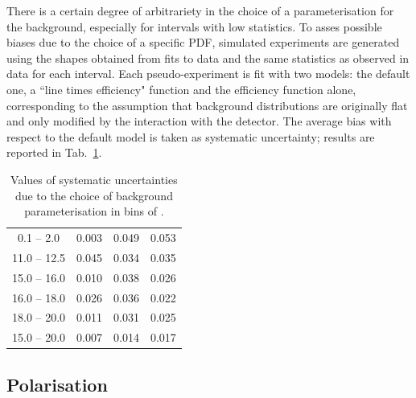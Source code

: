 There is a certain degree of arbitrariety in the choice of a parameterisation for the background,
especially for \qsq intervals with low statistics. To asses possible biases due to the choice of a specific PDF, simulated experiments
are generated using the shapes obtained from fits to data and the same statistics as observed in data for each \qsq interval.
Each pseudo-experiment is fit with two models: the default one, a ``line times efficiency" function and
the efficiency function alone, corresponding to the assumption that background distributions
are originally flat and only modified by the interaction with the detector. 
The average bias with respect to the default model is taken as systematic uncertainty;
results are reported in Tab.~\ref{tab:bkgParamSys}.
%
%
\begin{center}
\begin{table}[h]
\centering
\caption{ Values of systematic uncertainties due to the choice of background parameterisation in bins of \qsq. }
\begin{tabular}{c|ccc}
 \boldmath{ \qsq [\gevgevcccc] } &  \boldmath{ $\afbl$ }     &  \boldmath{  $\fl$ }      &  \boldmath{ $\afbh$   } \\ \hline
\phantom{x}0.1 -- 2.0\phantom{x}         &  0.003	 &   0.049	  &  0.053		\\
11.0 -- 12.5		&  0.045     &   0.034	  &  0.035     \\
15.0 -- 16.0 	&  0.010     &   0.038    &  0.026     \\
16.0 -- 18.0 	&  0.026     &   0.036    &  0.022     \\
18.0 -- 20.0 	&  0.011     &   0.031    &  0.025     \\
\hline
15.0 -- 20.0		&  0.007     &   0.014    &  0.017     \\
\end{tabular}
\label{tab:bkgParamSys}
\end{table}
\end{center}




\subsection{Polarisation}
\label{sec:ang_pol_sys}

